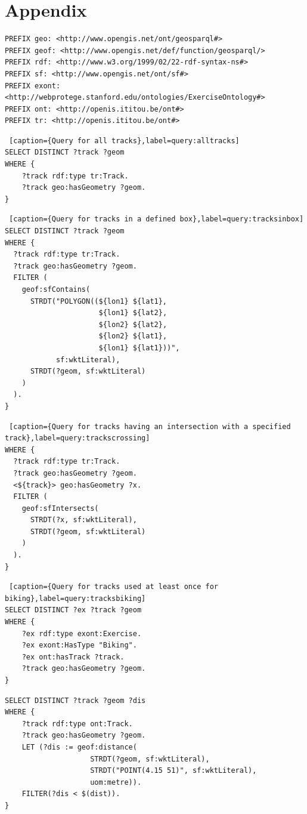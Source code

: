 \documentclass[11pt,a4paper]{scrreprt}
\begin{document}
\chapter*{Appendix}
\begin{lstlisting}[caption={Prefixes used in the hereinbelow queries},label=query:prefixes]
PREFIX geo: <http://www.opengis.net/ont/geosparql#>
PREFIX geof: <http://www.opengis.net/def/function/geosparql/>
PREFIX rdf: <http://www.w3.org/1999/02/22-rdf-syntax-ns#>
PREFIX sf: <http://www.opengis.net/ont/sf#>
PREFIX exont: <http://webprotege.stanford.edu/ontologies/ExerciseOntology#>
PREFIX ont: <http://openis.ititou.be/ont#>
PREFIX tr: <http://openis.ititou.be/ont#>
\end{lstlisting}
\begin{lstlisting} [caption={Query for all tracks},label=query:alltracks]
SELECT DISTINCT ?track ?geom
WHERE {
    ?track rdf:type tr:Track.
    ?track geo:hasGeometry ?geom.
}
\end{lstlisting}

\begin{lstlisting} [caption={Query for tracks in a defined box},label=query:tracksinbox]
SELECT DISTINCT ?track ?geom
WHERE {
  ?track rdf:type tr:Track.
  ?track geo:hasGeometry ?geom.
  FILTER (
    geof:sfContains(
      STRDT("POLYGON((${lon1} ${lat1}, 
      				  ${lon1} ${lat2}, 
      				  ${lon2} ${lat2}, 
      				  ${lon2} ${lat1}, 
      				  ${lon1} ${lat1}))", 
      	    sf:wktLiteral),
      STRDT(?geom, sf:wktLiteral)
    )
  ).
}
\end{lstlisting}

\begin{lstlisting} [caption={Query for tracks having an intersection with a specified track},label=query:trackscrossing]
WHERE {
  ?track rdf:type tr:Track.
  ?track geo:hasGeometry ?geom.
  <${track}> geo:hasGeometry ?x.
  FILTER (
    geof:sfIntersects(
      STRDT(?x, sf:wktLiteral),
      STRDT(?geom, sf:wktLiteral)
    )
  ).
}
\end{lstlisting}
\begin{lstlisting} [caption={Query for tracks used at least once for biking},label=query:tracksbiking]
SELECT DISTINCT ?ex ?track ?geom
WHERE {
    ?ex rdf:type exont:Exercise.
    ?ex exont:HasType "Biking".
    ?ex ont:hasTrack ?track.
    ?track geo:hasGeometry ?geom.
}
\end{lstlisting}

\begin{lstlisting}[caption={Query for tracks within a specified distance of a point }, label = query:tracksbiking ]
SELECT DISTINCT ?track ?geom ?dis
WHERE {
    ?track rdf:type ont:Track.
    ?track geo:hasGeometry ?geom.
    LET (?dis := geof:distance( 
    				STRDT(?geom, sf:wktLiteral), 
    				STRDT("POINT(4.15 51)", sf:wktLiteral),
    				uom:metre)).
    FILTER(?dis < $(dist)).
}
\end{lstlisting}
\end{document}
